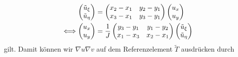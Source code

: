 \begin{align}\notag
	\begin{pmatrix} \tilde u_\xi \\ \tilde u_\eta \end{pmatrix} & = \begin{pmatrix}
				x_2-x_1 & y_2-y_1 \\
				x_3-x_1 & y_3-y_1
			\end{pmatrix}   \begin{pmatrix}  u_x \\  u_y \end{pmatrix} \\
	\Longleftrightarrow  \begin{pmatrix}  u_x \\  u_y \end{pmatrix} & =\frac 1J \begin{pmatrix}
				y_3-y_1 & y_1-y_2 \\
				x_1-x_3 & x_2-x_1
			\end{pmatrix} \begin{pmatrix} \tilde u_\xi \\ \tilde u_\eta \end{pmatrix}\label{eq:Kettenregel}
\end{align}
gilt. Damit können wir $\nabla u \nabla v$ auf dem Referenzelement $\widetilde T$ ausdrücken durch
